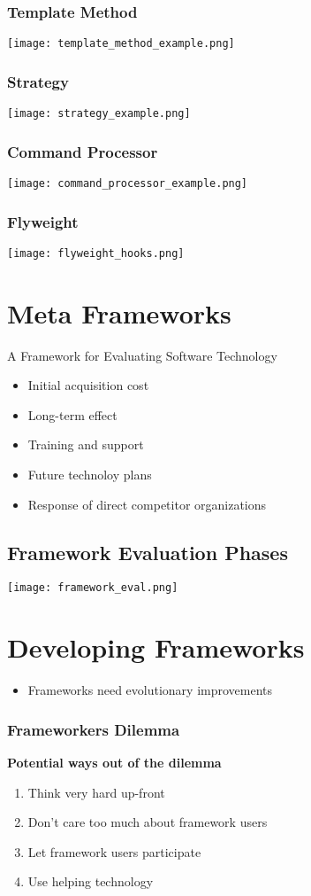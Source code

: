 \subsubsection{Template Method}
\texttt{[image: template\_method\_example.png]}
\subsubsection{Strategy}
\texttt{[image: strategy\_example.png]}
\subsubsection{Command Processor}
\texttt{[image: command\_processor\_example.png]}
\subsubsection{Flyweight}
\texttt{[image: flyweight\_hooks.png]}



\section{Meta Frameworks}
A Framework for Evaluating Software Technology
\begin{itemize}
    \item Initial acquisition cost
    \item Long-term effect
    \item Training and support
    \item Future technoloy plans
    \item Response of direct competitor organizations
\end{itemize}

\subsection{Framework Evaluation Phases}
\texttt{[image: framework\_eval.png]}

\section{Developing Frameworks}
\begin{itemize}
    \item Frameworks need evolutionary improvements
\end{itemize}
\subsubsection{Frameworkers Dilemma}
\textbf{Potential ways out of the dilemma}
\begin{enumerate}
    \item Think very hard up-front
    \item Don't care too much about framework users
    \item Let framework users participate
    \item Use helping technology
\end{enumerate}
